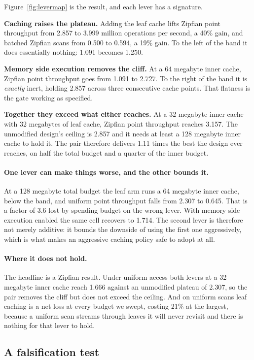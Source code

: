 \documentclass[sigconf,nonacm]{acmart}
\begin{document}
Figure~\ref{fig:levermap} is the result, and each lever has a signature.

\textbf{Caching raises the plateau.} Adding the leaf cache lifts Zipfian point
throughput from 2.857 to 3.999 million operations per second, a 40\% gain, and
batched Zipfian scans from 0.500 to 0.594, a 19\% gain. To the left of the band it
does essentially nothing: 1.091 becomes 1.250.

\textbf{Memory side execution removes the cliff.} At a 64 megabyte inner cache,
Zipfian point throughput goes from 1.091 to 2.727. To the right of the band it is
\emph{exactly} inert, holding 2.857 across three consecutive cache points. That
flatness is the gate working as specified.

\textbf{Together they exceed what either reaches.} At a 32 megabyte inner cache
with 32 megabytes of leaf cache, Zipfian point throughput reaches 3.157. The
unmodified design's ceiling is 2.857 and it needs at least a 128 megabyte inner
cache to hold it. The pair therefore delivers 1.11 times the best the design ever
reaches, on half the total budget and a quarter of the inner budget.

\paragraph{One lever can make things worse, and the other bounds it.}
At a 128 megabyte total budget the leaf arm runs a 64 megabyte inner cache, below
the band, and uniform point throughput falls from 2.307 to 0.645. That is a
factor of 3.6 lost by spending budget on the wrong lever. With memory side
execution enabled the same cell recovers to 1.714. The second lever is therefore
not merely additive: it bounds the downside of using the first one aggressively,
which is what makes an aggressive caching policy safe to adopt at all.

\paragraph{Where it does not hold.}
The headline is a Zipfian result. Under uniform access both levers at a 32
megabyte inner cache reach 1.666 against an unmodified plateau of 2.307, so the
pair removes the cliff but does not exceed the ceiling. And on uniform scans leaf
caching is a net loss at every budget we swept, costing 21\% at the largest,
because a uniform scan streams through leaves it will never revisit and there is
nothing for that lever to hold.

\subsection{A falsification test}
\label{sec:chime:falsify}
\end{document}
